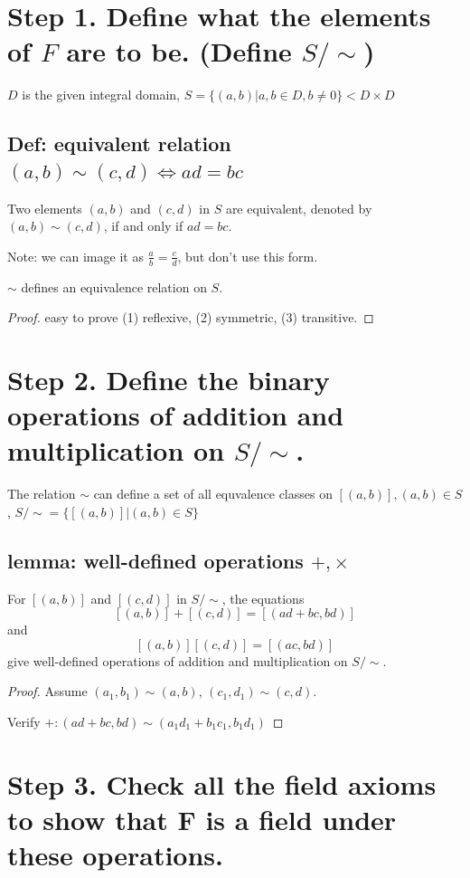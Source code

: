 \documentclass[11pt]{elegantbook}
\begin{document}
\section{Step 1. Define what the elements of $F$ are to be. (Define $S/\sim$)}
$D$ is the given integral domain, $S=\{(a,b)|a,b\in D,b\neq 0\}<D\times D$
\subsection{Def: equivalent relation $(a,b)\sim(c,d) \Leftrightarrow	ad = bc$}
\begin{definition}
    Two elements $(a, b)$ and $(c, d)$ in $S$ are equivalent, denoted by $(a, b) \sim (c, d)$, if and only if $ad = bc$.

    Note: we can image it as $\frac{a}{b}=\frac{c}{d}$, but don't use this form.
\end{definition}

\begin{lemma}
    $\sim$ defines an equivalence relation on $S$.
\end{lemma}
\begin{proof}
easy to prove (1) reflexive, (2) symmetric, (3) transitive.
\end{proof}

\section{Step 2. Define the binary operations of addition and multiplication on $S/\sim$.}
The relation $\sim$ can define a set of all equvalence classes on $[(a,b)], (a,b)\in S$, $S/\sim=\{[(a,b)]|(a,b)\in S\}$
\subsection{lemma: well-defined operations $+,\times$}
\begin{lemma}
    For $[(a, b)]$ and $[(c, d)]$ in $S/\sim$, the equations
    $$
    [(a, b)]+[(c, d)]=[(a d+b c, b d)]
    $$
    and
    $$
    [(a, b)][(c, d)]=[(a c, b d)]
    $$
    give well-defined operations of addition and multiplication on $S/\sim$.
\end{lemma}
\begin{proof}
Assume $(a_1,b_1)\sim(a,b)$, $(c_1,d_1)\sim (c,d)$.

Verify $+:(ad+bc,bd)\sim (a_1d_1+b_1c_1,b_1d_1)$

\end{proof}

\section{Step 3. Check all the field axioms to show that F is a field under these operations.}
\end{document}
